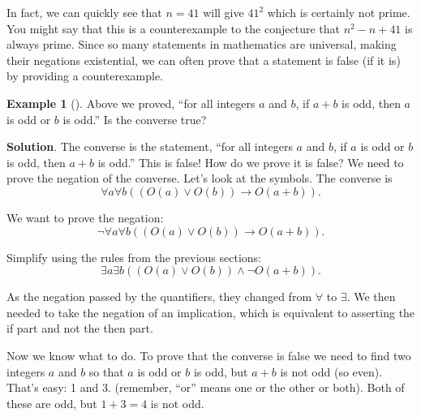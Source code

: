 \documentclass[10pt,]{book}
\theoremstyle{plain}
\theoremstyle{definition}
\theoremstyle{definition}
\newtheorem{example}[theorem]{Example}
\theoremstyle{definition}
\theoremstyle{definition}
\numberwithin{equation}{chapter}
\def\imp{\rightarrow}
\begin{document}
\par
\hypertarget{p-2092}{}%
In fact, we can quickly see that \(n = 41\) will give \(41^2\) which is certainly not prime. You might say that this is a counterexample to the conjecture that \(n^2 - n + 41\) is always prime. Since so many statements in mathematics are universal, making their negations existential, we can often prove that a statement is false (if it is) by providing a counterexample.%
\begin{example}[]\label{example-72}
\hypertarget{p-2093}{}%
Above we proved, ``for all integers \(a\) and \(b\), if \(a+b\) is odd, then \(a\) is odd or \(b\) is odd.'' Is the converse true?%
\par\smallskip%
\noindent\textbf{Solution}.\hypertarget{solution-189}{}\quad%
\hypertarget{p-2094}{}%
The converse is the statement, ``for all integers \(a\) and \(b\), if \(a\) is odd or \(b\) is odd, then \(a + b\) is odd.'' This is false! How do we prove it is false? We need to prove the negation of the converse. Let's look at the symbols. The converse is%
\begin{equation*}
\forall a \forall b ((O(a) \vee O(b)) \imp O(a+b)).
\end{equation*}
%
\par
\hypertarget{p-2095}{}%
We want to prove the negation:%
\begin{equation*}
\neg \forall a \forall b ((O(a) \vee O(b)) \imp O(a+b)).
\end{equation*}
%
\par
\hypertarget{p-2096}{}%
Simplify using the rules from the previous sections:%
\begin{equation*}
\exists a \exists b ((O(a) \vee O(b)) \wedge \neg O(a+b)).
\end{equation*}
%
\par
\hypertarget{p-2097}{}%
As the negation passed by the quantifiers, they changed from \(\forall\) to \(\exists\). We then needed to take the negation of an implication, which is equivalent to asserting the if part and not the then part.%
\par
\hypertarget{p-2098}{}%
Now we know what to do. To prove that the converse is false we need to find two integers \(a\) and \(b\) so that \(a\) is odd or \(b\) is odd, but \(a+b\) is not odd (so even). That's easy: 1 and 3. (remember, ``or'' means one or the other or both). Both of these are odd, but \(1+3 = 4\) is not odd.%
\end{example}
\typeout{************************************************}
\typeout{************************************************}
\end{document}
